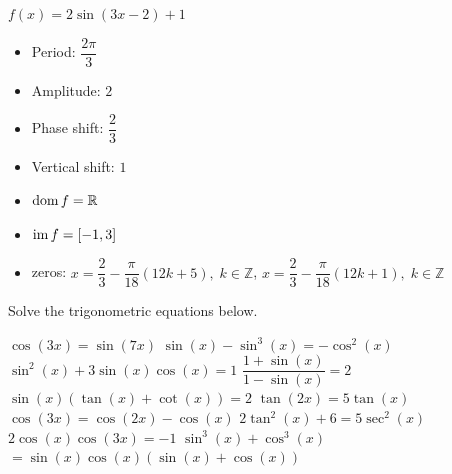 \begin{Answer}
\begin{multicols}{2}
    	\Question $f(x)= 2 \sin \left( 3x-2 \right)+1 $
    	\begin{itemize}
    	    \item Period: $\dfrac{2\pi}{3}$
    	    \item Amplitude: $2$
    	    \item Phase shift: $\dfrac{2}{3}$
    	    \item Vertical shift: $1$
    	    \item $\text{dom}{\,} f = \mathbb{R}$
    	    \item $\text{im}{\,}f = [-1,3]$
    	    \item zeros: $x=\dfrac{2}{3} - \dfrac{\pi}{18}(12k+5), \; k \in \mathbb{Z}$, \quad  $x=\dfrac{2}{3} - \dfrac{\pi}{18}(12k+1), \; k \in \mathbb{Z}$
    	\end{itemize}
    \EndCurrentQuestion
    \ifanalysis \end{multicols} \fi
\end{Answer}

\begin{Exercise} Solve the trigonometric equations below.
\begin{multicols}{2}
	\Question[difficulty = 1] $\cos (3x)=\sin (7x)$ 
	\ifanalysis\Question[difficulty = 1]\fi\ifcalculus\Question[difficulty = 2]\fi $\sin (x)-\sin^3(x)=-\cos^2(x)$
	\ifanalysis\Question[difficulty = 1]\fi\ifcalculus\Question[difficulty = 2]\fi $\sin^2(x)+3\sin (x) \cos (x)=1$ 
	\Question[difficulty = 1] $\dfrac{1+\sin (x)}{1-\sin (x)}=2$
	\ifanalysis\Question[difficulty = 1]\fi\ifcalculus\Question[difficulty = 2]\fi $\sin (x) (\tan (x)+\cot (x))=2$
	\ifanalysis\Question[difficulty = 1]\fi\ifcalculus\Question[difficulty = 2]\fi $\tan (2x)=5\tan (x)$ 
	\ifanalysis\Question[difficulty = 3]\fi\ifcalculus\Question[difficulty = 3]\fi $\cos (3x)=\cos (2x) - \cos (x)$
	\ifanalysis\Question[difficulty = 1]\fi\ifcalculus\Question[difficulty = 2]\fi $2 \tan^2(x)+6 = 5 \sec^2 (x) $
	\Question[difficulty = 3] $2 \cos (x) \cos(3x) = -1 $ 
	\Question[difficulty = 3] $\sin^3 (x) + \cos^3 (x)$ \\$ = \sin (x) \cos (x) (\sin (x) + \cos (x)) $
    \EndCurrentQuestion
\end{multicols}

\end{Exercise}

